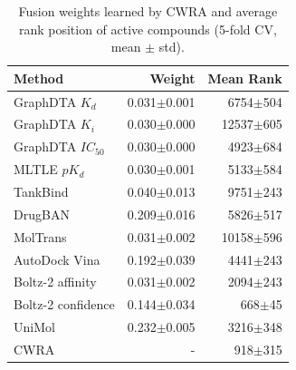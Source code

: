 \begin{table}[htbp!]
\centering
\caption{Fusion weights learned by CWRA and average rank position of active compounds (5-fold CV, mean $\pm$ std).}
\label{tab:fusion_weights_meanrank}
\small
\begin{tabular}{lrr}
\toprule
Method & Weight & Mean Rank \\
\midrule
GraphDTA $K_{d}$ & 0.031$\pm$0.001 & 6754$\pm$504 \\
GraphDTA $K_{i}$ & 0.030$\pm$0.000 & 12537$\pm$605 \\
GraphDTA $IC_{50}$ & 0.030$\pm$0.000 & 4923$\pm$684 \\
MLTLE $pK_d$ & 0.030$\pm$0.001 & 5133$\pm$584 \\
TankBind & 0.040$\pm$0.013 & 9751$\pm$243 \\
DrugBAN & 0.209$\pm$0.016 & 5826$\pm$517 \\
MolTrans & 0.031$\pm$0.002 & 10158$\pm$596 \\
AutoDock Vina & 0.192$\pm$0.039 & 4441$\pm$243 \\
Boltz-2 affinity & 0.031$\pm$0.002 & 2094$\pm$243 \\
Boltz-2 confidence & 0.144$\pm$0.034 & 668$\pm$45 \\
UniMol & 0.232$\pm$0.005 & 3216$\pm$348 \\
CWRA & - & 918$\pm$315 \\
\bottomrule
\end{tabular}
\end{table}